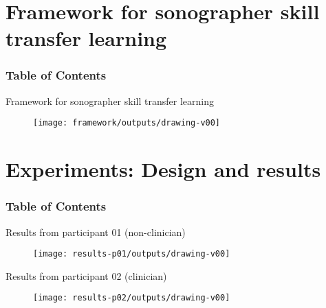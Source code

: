 {\section{Framework for sonographer skill transfer learning}
\begin{frame}
      \frametitle{Table of Contents}
      \tableofcontents[currentsection]
\end{frame}

{

\begin{frame}{Framework for sonographer skill transfer learning}{}

      \begin{figure}
        \centering
        \texttt{[image: framework/outputs/drawing-v00]}
      \end{figure}
\end{frame}
}



\section{Experiments: Design and results}
\begin{frame}
      \frametitle{Table of Contents}
      \tableofcontents[currentsection]
  \end{frame}

{

\begin{frame}{Results from participant 01 (non-clinician)}{}

      \begin{figure}
        \centering
        \texttt{[image: results-p01/outputs/drawing-v00]}
      \end{figure}
\end{frame}
}

\begin{frame}{Results from participant 02 (clinician)}{}

      \begin{figure}
        \centering
        \texttt{[image: results-p02/outputs/drawing-v00]}
      \end{figure}
\end{frame}
}



